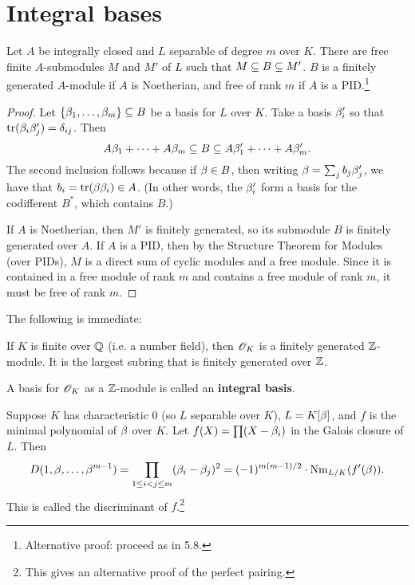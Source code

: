 \section{Integral bases}
\begin{pr}
Let $A$ be integrally closed and $L$ separable of degree $m$ over $K$. There are free finite $A$-submodules $M$ and $M'$ of $L$ such that $M\subseteq B\subseteq M'$.
$B$ is a finitely generated $A$-module if $A$ is Noetherian, and free of rank $m$ if $A$ is a PID.\footnote{Alternative proof: proceed as in 5.8.}
\end{pr}
\begin{proof}
Let $\{\beta_1,\ldots, \beta_m\}\subseteq B$ be a basis for $L$ over $K$. Take a basis $\beta_i'$ so that $\operatorname{tr}(\beta_i\beta_j')=\delta_{ij}$. Then
\[A\beta_1+\cdots +A\beta_m\subseteq B\subseteq A\beta_1'+\cdots +A\beta_m'.\]
The second inclusion follows because if $\beta\in B$, then writing $\beta=\sum_j b_j\beta_j'$, we have that $b_i=\operatorname{tr}(\beta\beta_i)\in A$. (In other words, the $\beta_i'$ form a basis for the codifferent $B^*$, which contains $B$.)

If $A$ is Noetherian, then $M'$ is finitely generated, so its submodule $B$ is finitely generated over $A$. If $A$ is a PID, then by the Structure Theorem for Modules (over PIDs), $M$ is a direct sum of cyclic modules and a free module. Since it is contained in a free module of rank $m$ and contains a free module of rank $m$, it must be free of rank $m$.
\end{proof}
The following is immediate:
\begin{thm}
If $K$ is finite over $\mathbb{Q}$ (i.e. a number field), then $\mathscr{O}_K$ is a finitely generated $\mathbb{Z}$-module. It is the largest subring that is finitely generated over $\mathbb{Z}$.
\end{thm}
\begin{df}
A basis for $\mathscr{O}_K$ as a $\mathbb{Z}$-module is called an \textbf{integral basis}.
\end{df}
\begin{pr}
Suppose $K$ has characteristic 0 (so $L$ separable over $K$), $L=K[\beta]$, and $f$ is the minimal polynomial of $\beta$ over $K$. Let $f(X)=\prod (X-\beta_i)$ in the Galois closure of $L$. Then 
\[D(1,\beta,\ldots, \beta^{m-1})=\prod_{1\leq i<j\leq m}(\beta_i-\beta_j)^2=(-1)^{m(m-1)/2}\cdot \operatorname{Nm}_{L/K}(f'(\beta)).\]
This is called the discriminant of $f$.\footnote{This gives an alternative proof of the perfect pairing. }
\end{pr}
